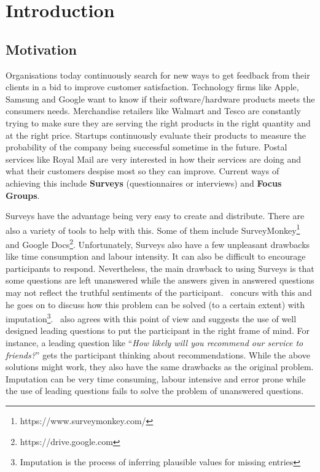 
\chapter{Introduction}
\label{cha:introduction}

\section{Motivation}
\label{sec:motivation}
Organisations today continuously search for new ways to get feedback from their clients in a bid to
improve customer satisfaction. Technology firms like Apple, Samsung and Google want to know if their
software/hardware products meets the consumers needs.  Merchandise retailers like Walmart and Tesco
are constantly trying to make sure they are serving the right products in the right quantity and at
the right price. Startups continuously evaluate their products to measure the probability of the
company being successful sometime in the future. Postal services like Royal Mail are very interested
in how their services are doing and what their customers despise most so they can improve. Current
ways of achieving this include \textbf{Surveys} (questionnaires or interviews) and \textbf{Focus
Groups}.

Surveys have the advantage being very easy to create and distribute. There are also a variety of
tools to help with this. Some of them include SurveyMonkey\footnote{https://www.surveymonkey.com/}
and Google Docs\footnote{https://drive.google.com}. Unfortunately, Surveys also have a few
unpleasant drawbacks like time consumption and labour intensity. It can also be difficult to
encourage participants to respond. Nevertheless, the main drawback to using Surveys is that some
questions are left unanswered while the answers given in answered questions may not reflect the
truthful sentiments of the participant.~\cite{DonaldBRubin1987} concurs with this and he goes on to
discuss how this problem can be solved (to a certain extent) with imputation\footnote{Imputation is
the process of inferring plausible values for missing entries}.~\cite{BobEHayes2008} also agrees
with this point of view and suggests the use of well designed leading questions to put the
participant in the right frame of mind. For instance, a leading question like ``\textit{How likely
will you recommend our service to friends?}'' gets the participant thinking about recommendations.
While the above solutions might work, they also have the same drawbacks as the original problem.
Imputation can be very time consuming, labour intensive and error prone while the use of leading
questions fails to solve the problem of unanswered questions.

